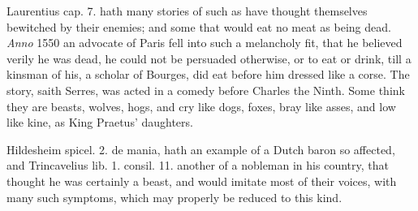 {Laurentius cap. 7. hath many stories of such as have thought themselves
bewitched by their enemies; and some that would eat no meat as being
dead. \emph{Anno} 1550 an advocate of Paris fell into such a
melancholy fit, that he believed verily he was dead, he could not be
persuaded otherwise, or to eat or drink, till a kinsman of his, a
scholar of Bourges, did eat before him dressed like a corse. The story,
saith Serres, was acted in a comedy before Charles the Ninth. Some
think they are beasts, wolves, hogs, and cry like dogs, foxes, bray
like asses, and low like kine, as King Praetus' daughters.

Hildesheim spicel. 2. de mania, hath an example of a Dutch baron
so affected, and Trincavelius lib. 1. consil. 11. another of a nobleman
in his country, that thought he was certainly a beast, and would
imitate most of their voices, with many such symptoms, which may
properly be reduced to this kind.

}
